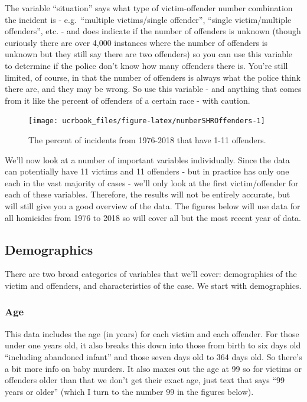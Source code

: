 \documentclass[
  12pt,
  openany]{book}
\begin{document}
The variable ``situation'' says what type of victim-offender number combination the incident is - e.g.~``multiple victims/single offender'', ``single victim/multiple offenders'', etc. - and does indicate if the number of offenders is unknown (though curiously there are over 4,000 instances where the number of offenders is unknown but they still say there are two offenders) so you can use this variable to determine if the police don't know how many offenders there is. You're still limited, of course, in that the number of offenders is always what the police think there are, and they may be wrong. So use this variable - and anything that comes from it like the percent of offenders of a certain race - with caution.

\begin{figure}

{\centering \texttt{[image: ucrbook\_files/figure-latex/numberSHROffenders-1]} 

}

\caption{The percent of incidents from 1976-2018 that have 1-11 offenders.}\label{fig:numberSHROffenders}
\end{figure}

We'll now look at a number of important variables individually. Since the data can potentially have 11 victims and 11 offenders - but in practice has only one each in the vast majority of cases - we'll only look at the first victim/offender for each of these variables. Therefore, the results will not be entirely accurate, but will still give you a good overview of the data. The figures below will use data for all homicides from 1976 to 2018 so will cover all but the most recent year of data.

\hypertarget{demographics}{%
\subsection{Demographics}\label{demographics}}

There are two broad categories of variables that we'll cover: demographics of the victim and offenders, and characteristics of the case. We start with demographics.

\hypertarget{age-1}{%
\subsubsection{Age}\label{age-1}}

This data includes the age (in years) for each victim and each offender. For those under one years old, it also breaks this down into those from birth to six days old ``including abandoned infant'' and those seven days old to 364 days old. So there's a bit more info on baby murders. It also maxes out the age at 99 so for victims or offenders older than that we don't get their exact age, just text that says ``99 years or older'' (which I turn to the number 99 in the figures below).
\end{document}
